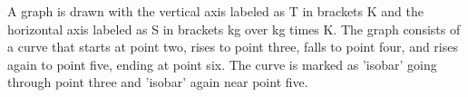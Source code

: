A graph is drawn with the vertical axis labeled as T in brackets K and the horizontal axis labeled as S in brackets kg over kg times K. The graph consists of a curve that starts at point two, rises to point three, falls to point four, and rises again to point five, ending at point six. The curve is marked as 'isobar' going through point three and 'isobar' again near point five.